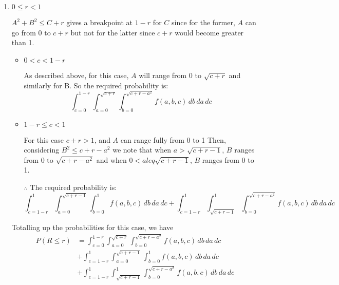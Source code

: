 \documentclass[12pt, oneside]{article}
\begin{document}
\begin{enumerate}
{\begin{enumerate}
        \item {
            \(0 \leq r < 1\)

            \(A^2 + B^2 \leq C + r\) gives a breakpoint at \(1 - r\) for \(C\) since
            for the former, \(A\) can go from \(0 \text{ to } c + r\) but not for the
            latter since \(c + r\) would become greater than 1.

            \begin{itemize}
                \item {
                    \(0 < c < 1 - r\)

                    As described above, for this case, \(A\) will range from 0 to 
                    \(\sqrt{c + r}\) and similarly for B.
                    So the required probability is:
                    \[
                        \int_{c = 0}^{1 - r} \int_{a=0}^{\sqrt{c + r}} 
                        \int_{b = 0}^{\sqrt{c + r - a^2}} f(a, b, c)\, db\, da\, dc
                    \]
                }

                \item {
                    \(1 - r \leq c < 1\)

                    For this case \(c + r > 1\), and \(A\) can range fully from 0 to 1
                    Then, considering \(B^2 \leq c + r - a^2\) we note that when 
                    \(a > \sqrt{c + r - 1}\), \(B\) ranges from 0 to \(\sqrt{c + r - a^2}\)
                    and when \(0 < a leq \sqrt{c + r - 1}\), \(B\) ranges from 0 to 1.

                    \(\therefore\) The required probability is:
                    \[
                        \int_{c = 1 - r}^{1} \int_{a=0}^{\sqrt{c + r - 1}} 
                        \int_{b = 0}^{1} f(a, b, c)\, db\, da\, dc
                        + \int_{c = 1 - r}^{1} \int_{\sqrt{c + r - 1}}^{1} 
                        \int_{b = 0}^{\sqrt{c + r - a^2}} f(a, b, c)\, db\, da\, dc
                    \]
                }
            \end{itemize}

            Totalling up the probabilities for this case, we have
            \begin{align*}
                P(R \leq r) &= \int_{c = 0}^{1 - r} \int_{a=0}^{\sqrt{c + r}} 
                \int_{b = 0}^{\sqrt{c + r - a^2}} f(a, b, c)\, db\, da\, dc \\
                &+ \int_{c = 1 - r}^{1} \int_{a=0}^{\sqrt{c + r - 1}} 
                \int_{b = 0}^{1} f(a, b, c)\, db\, da\, dc \\
                &+ \int_{c = 1 - r}^{1} \int_{\sqrt{c + r - 1}}^{1} 
                \int_{b = 0}^{\sqrt{c + r - a^2}} f(a, b, c)\, db\, da\, dc
            \end{align*}
        }


\end{enumerate}}
\end{enumerate}
\end{document}
